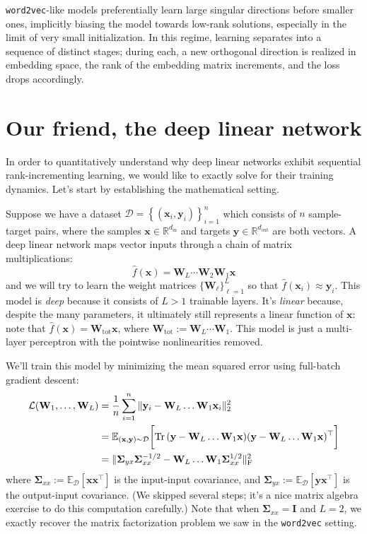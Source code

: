 \documentclass[12pt]{article}
\newcommand{\vx}{\mathbf{x}}
\newcommand{\vy}{\mathbf{y}}
\newcommand{\mW}{\mathbf{W}}
\newcommand{\mI}{\mathbf{I}}
\newcommand{\mSigma}{\boldsymbol{\Sigma}}
\newcommand{\R}{\mathbb{R}}
\newcommand{\E}{\mathbb{E}}
\begin{document}
\texttt{word2vec}-like models preferentially learn large singular directions before smaller ones, implicitly biasing the model towards low-rank solutions, especially in the limit of very small initialization. In this regime, learning separates into a sequence of distinct stages; during each, a new orthogonal direction is realized in embedding space, the rank of the embedding matrix increments, and the loss drops accordingly.

\section{Our friend, the deep linear network}

In order to quantitatively understand why deep linear networks exhibit sequential rank-incrementing learning, we would like to exactly solve for their training dynamics. Let's start by establishing the mathematical setting.

Suppose we have a dataset $\mathcal{D} = \left\{ (\vx_i, \vy_i) \right\}_{i=1}^n$ which consists of $n$ sample-target pairs, where the samples $\vx \in \R^{d_\text{in}}$ and targets $\vy \in \R^{d_\text{out}}$ are both vectors. A deep linear network maps vector inputs through a chain of matrix multiplications:
\begin{equation}
    \hat{f}(\vx) = \mW_L \cdots \mW_2 \mW_1 \vx
\end{equation}
and we will try to learn the weight matrices $\{ \mW_\ell \}_{\ell=1}^L$ so that $\hat{f}(\vx_i) \approx \vy_i$. This model is \emph{deep} because it consists of $L > 1$ trainable layers. It's \emph{linear} because, despite the many parameters, it ultimately still represents a linear function of $\vx$: note that $\hat{f}(\vx) = \mW_\text{tot} \vx$, where $\mW_\text{tot} := \mW_L \cdots \mW_1$. This model is just a multi-layer perceptron with the pointwise nonlinearities removed.

We'll train this model by minimizing the mean squared error using full-batch gradient descent:
\begin{align}
    \mathcal{L}(\mW_1, \dots, \mW_L)
    &= \frac{1}{n} \sum_{i=1}^{n} \|\vy_i - \mW_L \dots \mW_1 \vx_i\|_2^2 \notag \\
    &= \E_{(\vx,\vy)\sim\mathcal{D}} \bigg[\mathrm{Tr}\, (\vy - \mW_L \dots \mW_1 \vx)(\vy - \mW_L \dots \mW_1 \vx)^\top \bigg] \notag \\
    &= \|\mSigma_{yx}\mSigma_{xx}^{-1/2} - \mW_L \dots \mW_1 \mSigma_{xx}^{1/2}\|_\mathrm{F}^2
\end{align}
where $\mSigma_{xx}:=\E_\mathcal{D}[\vx\vx^\top]$ is the input-input covariance, and $\mSigma_{yx}:=\E_\mathcal{D}[\vy\vx^\top]$ is the output-input covariance. (We skipped several steps; it's a nice matrix algebra exercise to do this computation carefully.) Note that when $\mSigma_{xx} = \mI$ and $L = 2$, we exactly recover the matrix factorization problem we saw in the \texttt{word2vec} setting.
\end{document}
